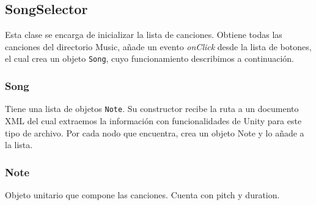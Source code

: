 \subsection{SongSelector}
Esta clase se encarga de inicializar la lista de canciones. Obtiene todas las canciones del directorio Music, 
añade un evento \textit{onClick} desde la lista de botones, el cual
crea un objeto \texttt{Song}, cuyo funcionamiento describimos a continuación.

\subsubsection{Song}
Tiene una lista de objetos \texttt{Note}. Su constructor recibe la ruta a un documento XML del cual extraemos la información con 
funcionalidades de Unity para este tipo de archivo. Por cada nodo que encuentra, crea un objeto Note y lo añade a la lista.

\subsubsection{Note}
Objeto unitario que compone las canciones. Cuenta con pitch y duration.

\pagebreak
